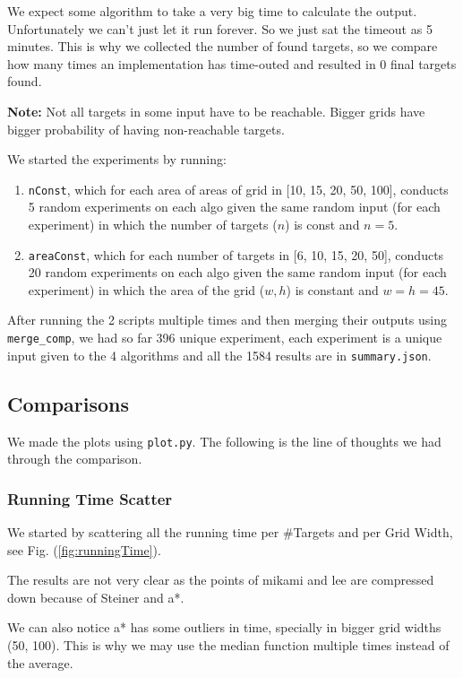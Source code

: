 We expect some algorithm to take a very big time to calculate the output. Unfortunately we can't just let it run forever. So we just sat the timeout as 5 minutes. This is why we collected the number of found targets, so we compare how many times an implementation has time-outed and resulted in 0 final targets found.

\textbf{Note:} Not all targets in some input have to be reachable. Bigger grids have bigger probability of having non-reachable targets.

We started the experiments by running:
\begin{enumerate}
    \item \texttt{nConst}, which for each area of areas of grid in [10, 15, 20, 50, 100], conducts 5 random experiments on each algo given the same random input (for each experiment) in which the number of targets ($n$) is const and $n = 5$.
    \item \texttt{areaConst}, which for each number of targets in [6, 10, 15, 20, 50], conducts 20 random experiments on each algo given the same random input (for each experiment) in which the area of the grid ($w,h$) is constant and $w = h = 45$.
\end{enumerate}

After running the 2 scripts multiple times and then merging their outputs using \texttt{merge\_comp}, we had so far 396 unique experiment, each experiment is a unique input given to the 4 algorithms and all the 1584 results are in \texttt{summary.json}.

\subsection{Comparisons}
We made the plots using \texttt{plot.py}. The following is the line of thoughts we had through the comparison.

\subsubsection{Running Time Scatter}
We started by scattering all the running time per \#Targets and per Grid Width, see Fig. (\ref{fig:runningTime}). 

The results are not very clear as the points of mikami and lee are compressed down because of Steiner and a*. 

We can also notice a* has some outliers in time, specially in bigger grid widths (50, 100). This is why we may use the median function multiple times instead of the average.


